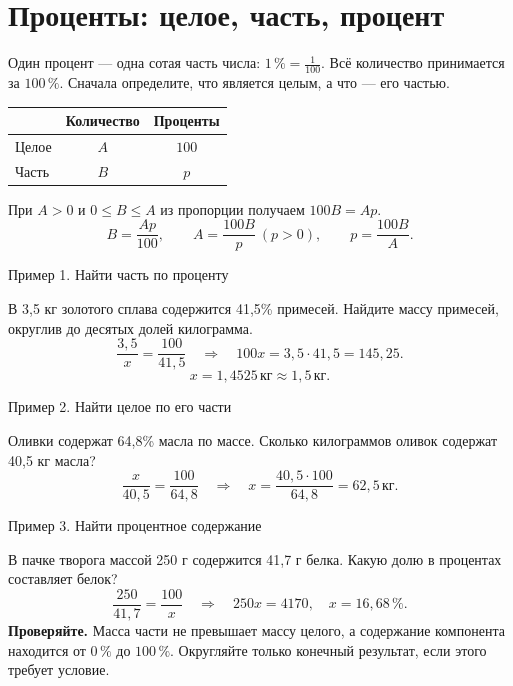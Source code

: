 \documentclass[a4paper,12pt]{article}
\newcommand{\idea}[1]{\textcolor{darkaccent}{\textbf{#1}}}
\newcommand{\ex}[1]{\par\medskip\textcolor{darkaccent}{#1}\par\smallskip}
\newcommand{\kg}{\,\text{кг}}
\newcommand{\pct}{\,\%}
\begin{document}
\section{Проценты: целое, часть, процент}
Один процент --- одна сотая часть числа: $1\pct=\frac1{100}$. Всё количество принимается за $100\pct$. Сначала определите, что является целым, а что --- его частью.
\begin{center}
\renewcommand{\arraystretch}{1.3}
\begin{tabular}{lcc}\toprule & Количество & Проценты\\\midrule Целое & $A$ & $100$\\ Часть & $B$ & $p$\\\bottomrule\end{tabular}
\end{center}
При $A>0$ и $0\le B\le A$ из пропорции получаем $100B=Ap$.
\[
B=\frac{Ap}{100},\qquad A=\frac{100B}{p}\ (p>0),\qquad p=\frac{100B}{A}.
\]
\ex{Пример 1. Найти часть по проценту}
В 3,5 кг золотого сплава содержится 41,5\% примесей. Найдите массу примесей, округлив до десятых долей килограмма.
\[
\frac{3{,}5}{x}=\frac{100}{41{,}5}\quad\Longrightarrow\quad
100x=3{,}5\cdot41{,}5=145{,}25.
\]
\[
x=1{,}4525\kg\approx1{,}5\kg.
\]
\ex{Пример 2. Найти целое по его части}
Оливки содержат 64,8\% масла по массе. Сколько килограммов оливок содержат 40,5 кг масла?
\[
\frac{x}{40{,}5}=\frac{100}{64{,}8}\quad\Longrightarrow\quad
x=\frac{40{,}5\cdot100}{64{,}8}=62{,}5\kg.
\]
\ex{Пример 3. Найти процентное содержание}
В пачке творога массой 250 г содержится 41,7 г белка. Какую долю в процентах составляет белок?
\[
\frac{250}{41{,}7}=\frac{100}{x}\quad\Longrightarrow\quad
250x=4170,\quad x=16{,}68\pct.
\]
\idea{Проверяйте.} Масса части не превышает массу целого, а содержание компонента находится от $0\pct$ до $100\pct$. Округляйте только конечный результат, если этого требует условие.
\clearpage
\end{document}
